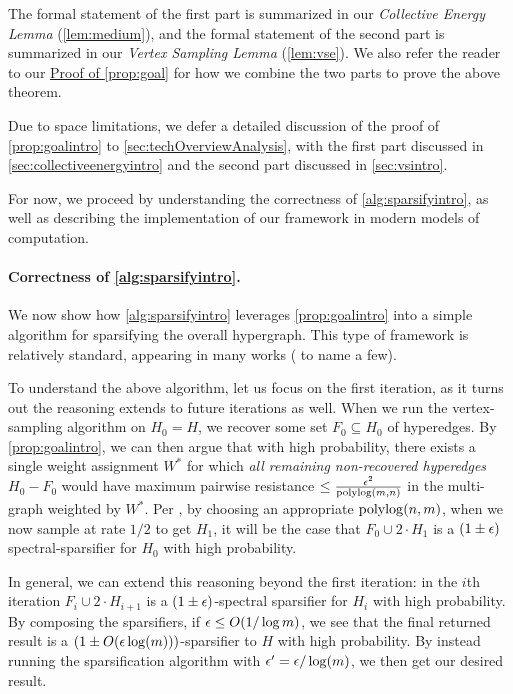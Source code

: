 \documentclass{article}
\begin{document}
The formal statement of the first part is summarized in our
\textit{Collective Energy Lemma} (\cref{lem:medium}),
and the formal statement of the second part is summarized in our
 \textit{Vertex Sampling Lemma} (\cref{lem:vse}).
We also refer the reader to our \hyperref[proof:thm1]{Proof of \cref*{prop:goal}}
for how we combine the two parts
to prove the above theorem.

Due to space limitations,
we defer a detailed discussion of the proof of \cref{prop:goalintro} to \cref{sec:techOverviewAnalysis}, with the first part discussed in \cref{sec:collectiveenergyintro} and the second part discussed in
\cref{sec:vsintro}.

For now, we proceed by
understanding the correctness of \cref{alg:sparsifyintro}, as well as
describing the implementation of our framework in modern models
of computation.




\paragraph{Correctness of \cref{alg:sparsifyintro}.}
 We now show how \cref{alg:sparsifyintro} leverages \cref{prop:goalintro} into a simple algorithm for sparsifying the overall hypergraph. This type of framework is relatively standard, appearing in many works (\cite{KoutisX16, GMT15, ADKKP16, ChenKL22, KPS24c} to name a few).

To understand the above algorithm, let us focus on the first iteration, as it turns out the reasoning extends to future iterations as well. When we run the vertex-sampling algorithm on $H_0 = H$, we recover some set $F_0 \subseteq H_0$ of hyperedges. By \cref{prop:goalintro}, we can then argue that with high probability, there exists a single weight assignment $W^*$ for which \emph{all remaining non-recovered hyperedges} $H_0 - F_0$ would have maximum pairwise resistance $\leq \frac{\epsilon^2}{\operatorname{polylog}(m,n)}$ in the multi-graph weighted by $W^*$. Per \cite{JambulapatiLS23},
by choosing an appropriate $\operatorname{polylog}(n,m)$,
when we now sample at rate $1/2$ to get $H_{1}$, it will be the case that $F_0 \cup 2 \cdot H_1$ is a $(1 \pm \epsilon)$ spectral-sparsifier for $H_0$ with high probability. 

In general, we can extend this reasoning beyond the first iteration: in the $i$th iteration $F_i \cup 2 \cdot H_{i+1}$ is a $(1 \pm \epsilon)$-spectral sparsifier for $H_i$ with high probability. By composing the sparsifiers,
if $\epsilon \leq O(1/\log m)$,
we see that the final returned result is a $(1 \pm O(\epsilon \log(m)))$-sparsifier to $H$ with high probability. By instead running the sparsification algorithm with $\epsilon' = \epsilon / \log(m)$, we then get our desired result.
\end{document}
